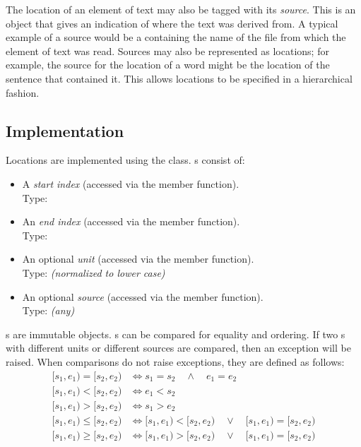 \documentclass[11pt]{article}
\begin{document}
  The location of an element of text may also be tagged with its
  \emph{source}.  This is an object that gives an indication of where
  the text was derived from.  A typical example of a source would be a
   containing the name of the file from which the element
  of text was read.  Sources may also be represented as locations; for
  example, the source for the location of a word might be the location
  of the sentence that contained it.  This allows locations to be
  specified in a hierarchical fashion.

  \subsection{Implementation}

  Locations are implemented using the  class.
  s consist of:

  \begin{itemize}

    \item A \emph{start index} (accessed via the  member
    function).  \\
    Type: 

    \item An \emph{end index} (accessed via the  member
    function).  \\
    Type: 

    \item An optional \emph{unit} (accessed via the 
    member function).  \\
    Type:  \emph{(normalized to lower case)}
    

    \item An optional \emph{source} (accessed via the 
    member function).  \\
    Type: \emph{(any)}

  \end{itemize}

  \noindent
  s are immutable objects.  s can be
  compared for equality and ordering.  If two s with
  different units or different sources are compared, then an exception
  will be raised.  When  comparisons do not raise
  exceptions, they are defined as follows:
  \begin{align*}
     [s_1,e_1) = [s_2,e_2) &\iff s_1=s_2 \quad \land \quad e_1=e_2 \\
     [s_1,e_1) < [s_2,e_2) &\iff e_1 < s_2 \\
     [s_1,e_1) > [s_2,e_2) &\iff s_1 > e_2 \\
     [s_1,e_1) \leq [s_2,e_2) &\iff [s_1,e_1) < [s_2,e_2) \quad \lor \quad
                             [s_1,e_1) = [s_2,e_2) \\
     [s_1,e_1) \geq [s_2,e_2) &\iff [s_1,e_1) > [s_2,e_2) \quad \lor \quad
                             [s_1,e_1) = [s_2,e_2) 
  \end{align*}
\end{document}
